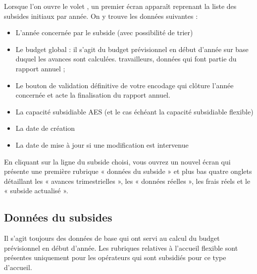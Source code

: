 Lorsque l’on ouvre le volet , un premier écran apparaît reprenant la liste des subsides initiaux par année. On y trouve les données suivantes :

\begin{itemize}
    \item L’année concernée par le subside (avec possibilité de trier)
    \item Le budget global : il s’agit du budget prévisionnel en début d’année sur base duquel les avances sont calculées. travailleurs, données qui font partie du rapport annuel ;
    \item Le bouton de validation définitive de votre encodage qui clôture l’année concernée et acte la finalisation du rapport annuel.    
    \item La capacité subsidiable AES (et le cas échéant la capacité subsidiable flexible)   
    \item La date de création   
    \item La date de mise à jour si une modification est intervenue    
\end{itemize}

En cliquant sur la ligne du subside choisi, vous ouvrez un nouvel écran qui présente une première rubrique « données du subside » et plus bas quatre onglets détaillant les « avances trimestrielles », les « données réelles », les frais réels et le « subside actualisé ».
\subsection{Données du subsides}

Il s’agit toujours des données de base qui ont servi au calcul du budget prévisionnel en début d’année. Les rubriques relatives à l’accueil flexible sont présentes uniquement pour les opérateurs qui sont subsidiés pour ce type d’accueil.

